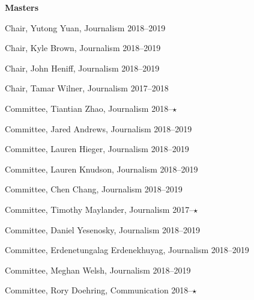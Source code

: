   \textbf{Masters}
    \begin{innerlist}
      \item Chair, Yutong Yuan, Journalism                                      \hfill 2018--2019
      \item Chair, Kyle Brown, Journalism                                       \hfill 2018--2019
      \item Chair, John Heniff, Journalism                                      \hfill 2018--2019
      \item Chair, Tamar Wilner, Journalism                                     \hfill 2017--2018
      \item Committee, Tiantian Zhao, Journalism                                \hfill 2018--$\star\hspace{1.5em}$
      \item Committee, Jared Andrews, Journalism                                \hfill 2018--2019
      \item Committee, Lauren Hieger, Journalism                                \hfill 2018--2019
      \item Committee, Lauren Knudson, Journalism                               \hfill 2018--2019
      \item Committee, Chen Chang, Journalism                                   \hfill 2018--2019
      \item Committee, Timothy Maylander, Journalism                            \hfill 2017--$\star\hspace{1.5em}$
      \item Committee, Daniel Yesenosky, Journalism                             \hfill 2018--2019
      \item Committee, Erdenetungalag Erdenekhuyag, Journalism                  \hfill 2018--2019
      \item Committee, Meghan Welsh, Journalism                                 \hfill 2018--2019
      \item Committee, Rory Doehring, Communication                             \hfill 2018--$\star\hspace{1.5em}$


\end{innerlist}

